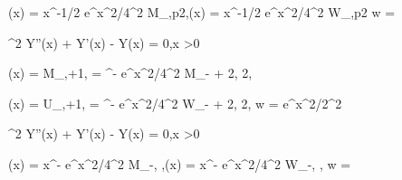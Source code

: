 \be
\psi(x) = x^{-1/2} e^{x^2/4\sigma^2} M_{,\frac p2},\quad\quad \varphi(x) =  x^{-1/2} e^{x^2/4\sigma^2} W_{,\frac p2}
\ee
\be
w = 
\ee

\item 

\be
\sigma^2 \theta Y''(x) +  Y'(x) - \lm Y(x) = 0,\quad x >0
\ee

\be
\psi(x) = M_{\frac{\lm}{2\theta},\nu+1,} = ^{-} e^{x^2/4\sigma^2} M_{-\frac{\lm}{2\theta} + 2, \frac{\nu}2},
\ee

\be
\varphi(x) = U_{\frac{\lm}{2\theta},\nu+1,} = ^{-} e^{x^2/4\sigma^2} W_{-\frac{\lm}{2\theta} + 2, \frac{\nu}2},
\ee
\be
w =  e^{x^2/2\sigma^2}
\ee

\item 

\be
\sigma^2 \theta Y''(x) +  Y'(x) -  Y(x) = 0,\quad x >0
\ee

\be
\psi(x) = x^{-} e^{x^2/4\sigma^2} M_{-, },\quad\quad \varphi(x) = x^{-} e^{x^2/4\sigma^2} W_{-, },
\ee
\be
w = 
\ee

\een





